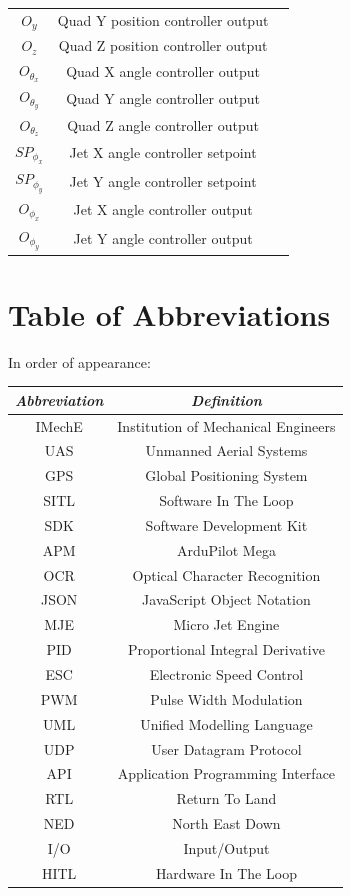 \documentclass[11pt]{article}
\begin{document}
\begin{center}
\begin{longtable}{|ccc|}
    $O_y$ & Quad Y position controller output & \\
    $O_z$ & Quad Z position controller output & \\
    $O_{\theta_x}$ & Quad X angle controller output & \\
    $O_{\theta_y}$ & Quad Y angle controller output & \\
    $O_{\theta_z}$ & Quad Z angle controller output & \\
    $SP_{\phi_x}$ & Jet X angle controller setpoint & \\
    $SP_{\phi_y}$ & Jet Y angle controller setpoint & \\
    $O_{\phi_x}$ & Jet X angle controller output & \\
    $O_{\phi_y}$ & Jet Y angle controller output & \\
    \hline
\end{longtable}
\end{center}

\section{Table of Abbreviations}
\begin{center}
    In order of appearance:
    \begin{longtable}{|cc|}
        \hline
        \emph{Abbreviation} & \emph{Definition} \\
        \hline \endhead
        IMechE & Institution of Mechanical Engineers \\
        UAS & Unmanned Aerial Systems \\
        GPS & Global Positioning System \\
        SITL & Software In The Loop \\
        SDK & Software Development Kit \\
        APM & ArduPilot Mega \\
        OCR & Optical Character Recognition \\
        JSON & JavaScript Object Notation \\
        MJE & Micro Jet Engine \\
        PID & Proportional Integral Derivative \\
        ESC & Electronic Speed Control \\
        PWM & Pulse Width Modulation \\
        UML & Unified Modelling Language \\
        UDP & User Datagram Protocol \\
        API & Application Programming Interface \\
        RTL & Return To Land \\
        NED & North East Down \\
        I/O & Input/Output \\
        HITL & Hardware In The Loop \\
        \hline
    \end{longtable}
\end{center}
\end{document}
